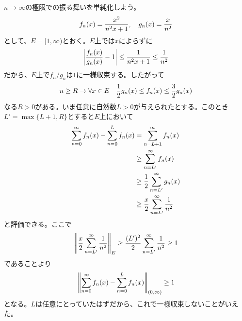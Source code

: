 \newpage



\subsubsection{}%
\begin{sol}
$n \to \infty$の極限での振る舞いを単純化しよう。
\[
f_n(x) = \frac{ x^2 }{ n^2 x + 1 }, \quad g_n(x) = \frac{x}{n^2}
\]
として、$E=[1, \infty)$とおく。$E$上では$x$によらずに
\[
\left \lvert  \frac{f_n(x)}{g_n(x)} - 1  \right \rvert \leq \frac{1}{n^2 x + 1} \leq \frac{1}{n^2}
\]
だから、$E$上で$f_n/g_n$は$1$に一様収束する。したがって
\[
n \geq R \to \forall x \in E \quad \frac{1}{2} g_n(x) \leq f_n(x) \leq \frac{3}{2} g_n(x)
\]
なる$R>0$がある。いま任意に自然数$L > 0$が与えられたとする。このとき$L'=\max \{ L+1,R  \}$とすると$E$上において
\begin{align*}
  \sum_{n=0}^{\infty} f_n(x) - \sum_{n=0}^{L} f_n(x) &= \sum_{n=L+1}^{\infty} f_n(x) \\
  &\geq \sum_{n=L'}^{\infty} f_n(x) \\
  &\geq \frac{1}{2}  \sum_{n=L'}^{\infty} g_n(x) \\
  &\geq \frac{x}{2}  \sum_{n=L'}^{\infty} \frac{1}{n^2}
\end{align*}
と評価できる。ここで
\[
\left \lVert  \frac{x}{2}  \sum_{n=L'}^{\infty} \frac{1}{n^2}  \right \rVert_E \geq \frac{(L')^2}{2}  \sum_{n=L'}^{\infty} \frac{1}{n^2} \geq 1
\]
であることより
\[
\left \lVert  \sum_{n=0}^{\infty} f_n(x) - \sum_{n=0}^{L} f_n(x)  \right \rVert_{(0, \infty)} \geq 1
\]
となる。$L$は任意にとっていたはずだから、これで一様収束しないことがいえた。
\end{sol}

\newpage


\subsubsection{}%
\begin{sol}

\end{sol}
